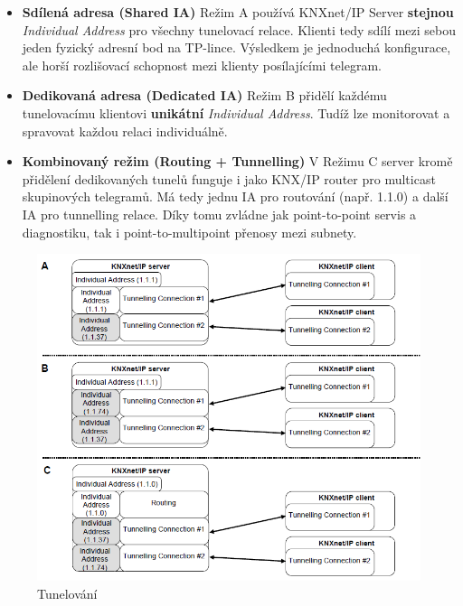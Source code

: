\begin{itemize}
  \item \textbf{Sdílená adresa (Shared IA)}  
    \newline Režim A používá KNXnet/IP Server \textbf{stejnou} \textit{Individual Address} pro všechny tunelovací relace. Klienti tedy sdílí mezi sebou jeden fyzický adresní bod na TP-lince. Výsledkem je jednoduchá konfigurace, ale horší rozlišovací schopnost mezi klienty posílajícími telegram.
  \item \textbf{Dedikovaná adresa (Dedicated IA)}  
    \newline Režim B přidělí každému tunelovacímu klientovi \textbf{unikátní} \textit{Individual Address}. Tudíž lze monitorovat a spravovat každou relaci individuálně.

  \item \textbf{Kombinovaný režim (Routing + Tunnelling)}  
    \newline V Režimu C server kromě přidělení dedikovaných tunelů funguje i jako KNX/IP router pro multicast skupinových telegramů. Má tedy jednu IA pro routování (např. 1.1.0) a další IA pro tunnelling relace. Díky tomu zvládne jak point-to-point servis a diagnostiku, tak i point-to-multipoint přenosy mezi subnety. \newline
\end{itemize}
\begin{figure}[!h]
  \begin{center}
    \includegraphics[scale=0.65]{obrazky/KNX_Tunelling.png}
  \end{center}
  \caption[Tunelování \cite{KNXTunnel}]{Tunelování \cite{KNXTunnel}}
  \label{fig:Tunelovani}
\end{figure}
